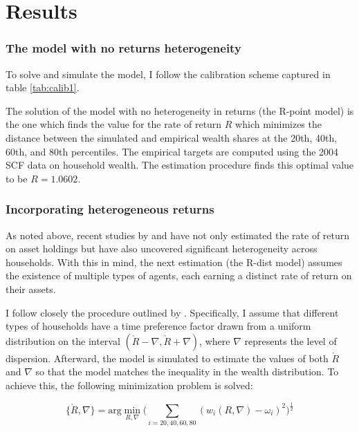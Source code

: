 
\section{Results}\notinsubfile{\label{sec:results}}

\subsubsection{The model with no returns heterogeneity}

\par To solve and simulate the model, I follow the calibration scheme captured in table \ref{tab:calib1}.
\unskip

\par The solution of the model with no heterogeneity in returns (the R-point model) is the one which finds the value for the rate of return $R$ which minimizes the distance between the simulated and empirical wealth shares at the 20th, 40th, 60th, and 80th percentiles. The empirical targets are computed using the 2004 SCF data on household wealth. The estimation procedure finds this optimal value to be $R = 1.0602$.

\subsubsection{Incorporating heterogeneous returns}

\par As noted above, recent studies by \cite{aflgdmlp20} and \cite{lblcps18} have not only estimated the rate of return on asset holdings but have also uncovered significant heterogeneity across households. With this in mind, the next estimation (the R-dist model) assumes the existence of multiple types of agents, each earning a distinct rate of return on their assets.

\par I follow closely the procedure outlined by \cite{cstw2017}. Specifically, I assume that different types of households have a time preference factor drawn from a uniform distribution on the interval $(\grave{R} - \nabla, \grave{R} + \nabla)$, where $\nabla$ represents the level of dispersion. Afterward, the model is simulated to estimate the values of both $\grave{R}$ and $\nabla$ so that the model matches the inequality in the wealth distribution. To achieve this, the following minimization problem is solved:

$$ \{\grave{R}, \nabla\} = \text{arg}\min_{R, \nabla} \bigg( \sum_{i=20, 40, 60, 80} (w_{i}(R, \nabla)-\omega_i )^{2} \bigg)^{\frac{1}{2}} $$

